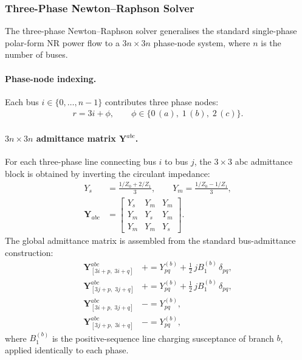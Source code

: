 \subsubsection{Three-Phase Newton--Raphson Solver}
\label{sec:dpf-three-phase-nr}

The three-phase Newton--Raphson solver generalises the standard single-phase
polar-form NR power flow to a $3n\times3n$ phase-node system, where $n$ is the
number of buses.

\paragraph{Phase-node indexing.}
Each bus $i\in\{0,\ldots,n{-}1\}$ contributes three phase nodes:
\begin{align}
  r = 3i + \phi, \qquad \phi \in \{0\,(a),\;1\,(b),\;2\,(c)\}.
\end{align}

\paragraph{\texorpdfstring{$3n\times3n$ admittance matrix $\mathbf{Y}^{abc}$}{3n x 3n admittance matrix Yabc}.}
For each three-phase line connecting bus $i$ to bus $j$, the $3\times3$ abc
admittance block is obtained by inverting the circulant impedance:
\begin{align}
  Y_s &= \frac{1/Z_0 + 2/Z_1}{3}, \qquad
  Y_m  = \frac{1/Z_0 - 1/Z_1}{3}, \\[6pt]
  \mathbf{Y}_{abc} &=
  \begin{bmatrix}
    Y_s & Y_m & Y_m \\
    Y_m & Y_s & Y_m \\
    Y_m & Y_m & Y_s
  \end{bmatrix}.
\end{align}
The global admittance matrix is assembled from the standard bus-admittance
construction:
\begin{align}
  \mathbf{Y}^{abc}_{[3i{+}p,\;3i{+}q]} &\mathrel{+}= Y^{(b)}_{pq}
    + \tfrac{1}{2}\,jB_1^{(b)}\,\delta_{pq}, \\
  \mathbf{Y}^{abc}_{[3j{+}p,\;3j{+}q]} &\mathrel{+}= Y^{(b)}_{pq}
    + \tfrac{1}{2}\,jB_1^{(b)}\,\delta_{pq}, \\
  \mathbf{Y}^{abc}_{[3i{+}p,\;3j{+}q]} &\mathrel{-}= Y^{(b)}_{pq}, \\
  \mathbf{Y}^{abc}_{[3j{+}p,\;3i{+}q]} &\mathrel{-}= Y^{(b)}_{pq},
\end{align}
where $B_1^{(b)}$ is the positive-sequence line charging susceptance of branch
$b$, applied identically to each phase.

